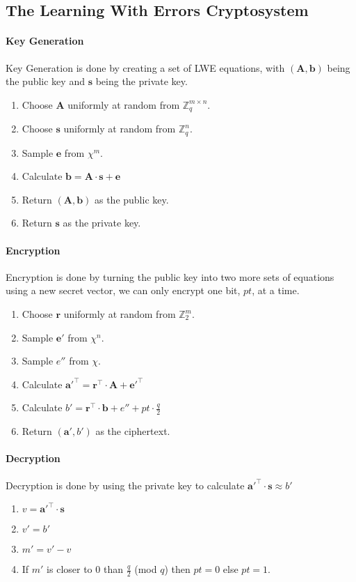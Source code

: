 \documentclass[a4paper, 11pt, openany]{book}
\begin{document}
\subsection{The Learning With Errors Cryptosystem}
\paragraph{Key Generation} Key Generation is done by creating a set of LWE equations, with $(\textbf{A},\textbf{b})$ being the public key and $\textbf{s}$ being the private key.
\\
\begin{enumerate}
	\item Choose $\textbf{A}$ uniformly at random from $\mathbb{Z}^{m\times n}_{q}$.
	\item Choose $\textbf{s}$ uniformly at random from $\mathbb{Z}^{n}_{q}$.
	\item Sample $\textbf{e}$ from $\chi^{m}$.
	\item Calculate $\textbf{b} = \textbf{A}\cdot \textbf{s}+\textbf{e}$
	\item Return $(\textbf{A},\textbf{b})$ as the public key.
	\item Return $\textbf{s}$ as the private key.
\end{enumerate}
\paragraph{Encryption} Encryption is done by turning the public key into two more sets of equations using a new secret vector, we can only encrypt one bit, $pt$, at a time.
\begin{enumerate}
	\item Choose $\textbf{r}$ uniformly at random from $\mathbb{Z}^{m}_{2}$.
	\item Sample $\textbf{e}'$ from $\chi^{n}$.
	\item Sample $e''$ from $\chi$.
	\item Calculate $\textbf{a}'^{\top} = \textbf{r}^{\top}\cdot\textbf{A} + \textbf{e}'^{\top}$
	\item Calculate $b' = \textbf{r}^{\top}\cdot\textbf{b} + e'' + pt\cdot\frac{q}{2}$
	\item Return $(\textbf{a}',b')$ as the ciphertext.
\end{enumerate}
\paragraph{Decryption} Decryption is done by using the private key to calculate $\textbf{a}'^{\top}\cdot\textbf{s} \approx b'$
\begin{enumerate}
	\item $v = \textbf{a}'^{\top}\cdot\textbf{s}$
	\item $v' = b'$
	\item $m' = v' - v$
	\item If $m'$ is closer to 0 than $\frac{q}{2}$ (mod $q$) then $pt = 0$ else $pt = 1$.
\end{enumerate}
\end{document}
